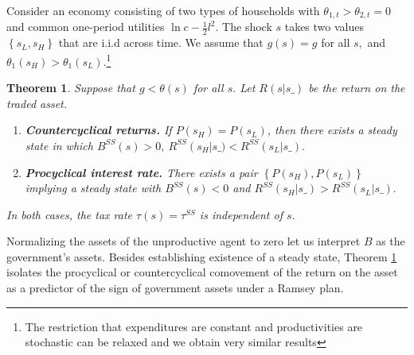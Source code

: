 \documentclass[thmsb,11pt]{article}
\newtheorem{theorem}{Theorem}
\begin{document}
Consider an economy consisting of  two types of households with $%
\theta _{1,t}>\theta _{2,t}=0$ and common one-period utilities  $\ln c-\frac{1}{2}%
l^{2}.$ The shock $s$  takes  two values$ \left\{
s_{L},s_{H}\right\} $ that are i.i.d across time.  We assume that $g\left( s\right) =g$ for all $s,$
and $\theta _{1}\left( s_{H}\right) >\theta _{1}\left( s_{L}\right) .$\footnote{The restriction that expenditures are constant and productivities are stochastic can be relaxed and we obtain very similar results}
\smallskip

\begin{theorem}
\label{thm long run forces}\smallskip Suppose that $g<\theta (s)$ for all $%
s.$ Let $R(s|s\_)$ be the return on the traded asset.

\begin{enumerate}
\item \textbf{Countercyclical returns.} If $P \left( s_{H}\right) =P\left( s_{L}\right)$, then
there exists a steady state in which
$B^{SS}(s)>0,\ R^{SS}\left( s_{H}\right|s\_) <R^{SS}\left( s_{L}|s\_\right) .$
\item \textbf{Procyclical interest rate.} There exists a pair  $\left\{ P \left( s_{H}\right) ,P\left( s_{L}\right)
\right\} $ implying a steady state with $B^{SS}(s)<0$ and  $R^{SS}\left( s_{H}|s\_\right) >R^{SS}\left( s_{L}|s\_\right) .$
\end{enumerate}
In both cases, the tax rate $\tau(s)=\tau^{SS}$ is independent of $s$.
\end{theorem}



Normalizing the assets of the unproductive agent to zero %
let us  interpret $B$ as the government's assets.
Besides establishing existence of a steady state, Theorem \ref{thm long run forces}
isolates the procyclical or countercyclical comovement of the return on the asset as a predictor of  the sign of government assets under a Ramsey plan.
\end{document}
